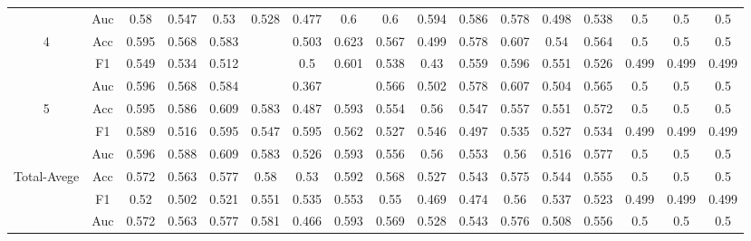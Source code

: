 \documentclass{ieeeaccess}
\begin{document}
\begin{table}[tb]
{\begin{tabular}{|c|c|c|c|c|c|c|c|c|c|c|c|c|c|c|c|c|}
\cline{2-17}
&Auc &0.58 &0.547 &0.53 &0.528 &0.477 &0.6 &0.6 &0.594 &0.586 &0.578 &0.498 &0.538 &0.5 &0.5 &0.5 \\\cline{1-17}
\multirow{3}{*}{4} &Acc &0.595 &0.568 &0.583 &\cellcolor{pink}{0.624} &0.503 &0.623 &0.567 &0.499 &0.578 &0.607 &0.54 &0.564 &0.5 &0.5 &0.5 \\
\cline{2-17}
&F1 &0.549 &0.534 &0.512 &\cellcolor{pink}{0.615} &0.5 &0.601 &0.538 &0.43 &0.559 &0.596 &0.551 &0.526 &0.499 &0.499 &0.499 \\
\cline{2-17}
&Auc &0.596 &0.568 &0.584 &\cellcolor{pink}{0.624} &0.367 &\cellcolor{pink}{0.624} &0.566 &0.502 &0.578 &0.607 &0.504 &0.565 &0.5 &0.5 &0.5 \\\cline{1-17}
\multirow{3}{*}{5} &Acc &0.595 &0.586 &0.609 &0.583 &0.487 &0.593 &0.554 &0.56 &0.547 &0.557 &0.551 &0.572 &0.5 &0.5 &0.5 \\
\cline{2-17}
&F1 &0.589 &0.516 &0.595 &0.547 &0.595 &0.562 &0.527 &0.546 &0.497 &0.535 &0.527 &0.534 &0.499 &0.499 &0.499 \\
\cline{2-17}
&Auc &0.596 &0.588 &0.609 &0.583 &0.526 &0.593 &0.556 &0.56 &0.553 &0.56 &0.516 &0.577 &0.5 &0.5 &0.5 \\\cline{1-17}
\multirow{3}{*}{Total-Avege} &Acc &0.572 &0.563 &0.577 &0.58 &0.53 &0.592 &0.568 &0.527 &0.543 &0.575 &0.544 &0.555 &0.5 &0.5 &0.5 \\
\cline{2-17}
&F1 &0.52 &0.502 &0.521 &0.551 &0.535 &0.553 &0.55 &0.469 &0.474 &0.56 &0.537 &0.523 &0.499 &0.499 &0.499 \\
\cline{2-17}
&Auc &0.572 &0.563 &0.577 &0.581 &0.466 &0.593 &0.569 &0.528 &0.543 &0.576 &0.508 &0.556 &0.5 &0.5 &0.5 \\\hline
\end{tabular}%
}
\label{tab:COMPARISON RESULTS FOR THE LEARNING CONDITION}
\end{table}
\end{document}
